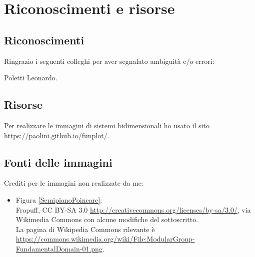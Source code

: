 \chapter{Riconoscimenti e risorse}
\section*{Riconoscimenti}
Ringrazio i seguenti colleghi per aver segnalato ambiguit\`a e/o errori:
\begin{center}
Poletti Leonardo.
\end{center}
\section*{Risorse}
Per realizzare le immagini di sistemi bidimensionali ho usato il sito \url{https://paolini.github.io/funplot/}.
\section*{Fonti delle immagini}
Crediti per le immagini non realizzate da me:
\begin{itemize}
\item Figura \ref{SemipianoPoincare}:\\
Fropuff, CC BY-SA 3.0 \url{http://creativecommons.org/licenses/by-sa/3.0/}, via Wikimedia Commons con alcune modifiche del sottoscritto.\\
La pagina di Wikipedia Commons rilevante \`e \url{https://commons.wikimedia.org/wiki/File:ModularGroup-FundamentalDomain-01.png}.
\end{itemize}
